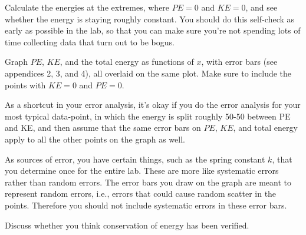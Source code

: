 
\selfcheck

Calculate the energies at the extremes, where $PE=0$ and
$KE=0$, and see whether the energy is staying roughly constant.
You should do this self-check as early as possible in the lab, so that
you can make sure you're not spending lots of time collecting data
that turn out to be bogus.

\analysis

Graph $PE$, $KE$, and the total energy as functions of $x$,
with error bars (see appendices 2, 3, and 4), all overlaid
on the same plot. Make sure to include the points with $KE=0$ and
$PE=0$.

As a shortcut in your error analysis, it's okay if you
do the error analysis for your most typical data-point, in which
the energy is split roughly 50-50 between PE and KE, and then assume
that the same error bars on $PE$, $KE$, and total energy apply to
all the other points on the graph as well.

As sources of error, you have certain things, such as the spring constant $k$,
that you determine once for the entire lab. These are more like systematic
errors rather than random errors. The error bars you draw on the graph are
meant to represent random errors, i.e., errors that could cause random scatter
in the points. Therefore you should not include systematic errors in these
error bars.

Discuss whether you think conservation of
energy has been verified.
